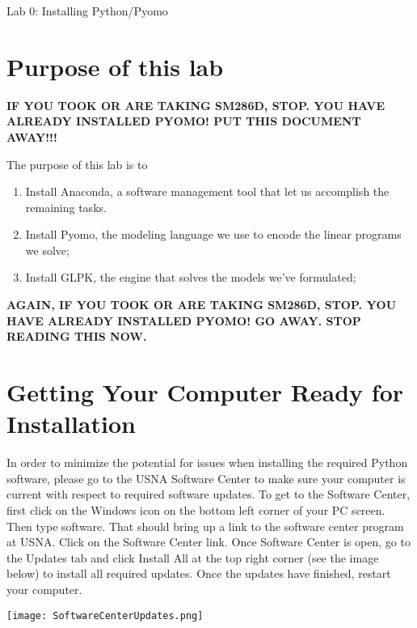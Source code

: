 \documentclass[12pt]{article}
\begin{document}
\pagestyle{fancy}  
\renewcommand\headrulewidth{2pt}


\begin{center}
{\large {\sc Lab 0: Installing Python/Pyomo}}
\end{center}

\section{Purpose of this lab}

{\bf IF YOU TOOK OR ARE TAKING SM286D, STOP. YOU HAVE ALREADY INSTALLED PYOMO! PUT THIS DOCUMENT AWAY!!!}

The purpose of this lab is to 
\begin{enumerate}
\item Install Anaconda, a software management tool that let us accomplish the remaining tasks.
\item Install Pyomo, the modeling language we use to encode the linear programs we solve;
\item Install GLPK, the engine that solves the models we've formulated;
\end{enumerate}

{\bf AGAIN, IF YOU TOOK OR ARE TAKING SM286D, STOP. YOU HAVE ALREADY INSTALLED PYOMO! GO AWAY. STOP READING THIS NOW.}

\section{Getting Your Computer Ready for Installation}

In order to minimize the potential for issues when installing the required Python software, please go to the USNA Software Center to make sure your computer is current with respect to required software updates.  To get to the Software Center, first click on the Windows icon on the bottom left corner of your PC screen. Then type software. That should bring up a link to the software center program at USNA. Click on the Software Center link.  Once Software Center is open, go to the Updates tab and click Install All at the top right corner (see the image below) to install all required updates.  Once the updates have finished, restart your computer.

\begin{center}
\texttt{[image: SoftwareCenterUpdates.png]}
\end{center} 
\end{document}
